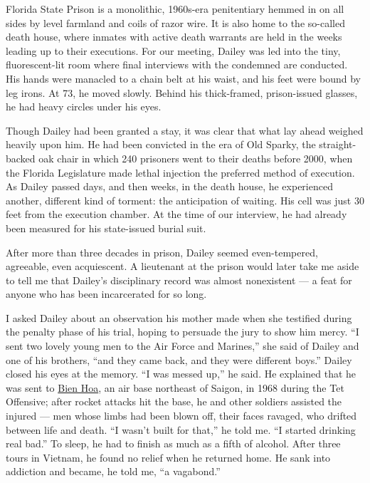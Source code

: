 Florida State Prison is a monolithic, 1960s-era penitentiary hemmed in
on all sides by level farmland and coils of razor wire. It is also home
to the so-called death house, where inmates with active death warrants
are held in the weeks leading up to their executions. For our meeting,
Dailey was led into the tiny, fluorescent-lit room where final
interviews with the condemned are conducted. His hands were manacled to
a chain belt at his waist, and his feet were bound by leg irons. At 73,
he moved slowly. Behind his thick-framed, prison-issued glasses, he had
heavy circles under his eyes.

Though Dailey had been granted a stay, it was clear that what lay ahead
weighed heavily upon him. He had been convicted in the era of Old
Sparky, the straight-backed oak chair in which 240 prisoners went to
their deaths before 2000, when the Florida Legislature made lethal
injection the preferred method of execution. As Dailey passed days, and
then weeks, in the death house, he experienced another, different kind
of torment: the anticipation of waiting. His cell was just 30 feet from
the execution chamber. At the time of our interview, he had already been
measured for his state-issued burial suit.

After more than three decades in prison, Dailey seemed even-tempered,
agreeable, even acquiescent. A lieutenant at the prison would later take
me aside to tell me that Dailey's disciplinary record was almost
nonexistent --- a feat for anyone who has been incarcerated for so long.

I asked Dailey about an observation his mother made when she testified
during the penalty phase of his trial, hoping to persuade the jury to
show him mercy. ``I sent two lovely young men to the Air Force and
Marines,'' she said of Dailey and one of his brothers, ``and they came
back, and they were different boys.'' Dailey closed his eyes at the
memory. ``I was messed up,'' he said. He explained that he was sent to
\href{https://www.historynet.com/big-ears-three-and-the-battle-of-bien-hoa.htm}{Bien
Hoa}, an air base northeast of Saigon, in 1968 during the Tet Offensive;
after rocket attacks hit the base, he and other soldiers assisted the
injured --- men whose limbs had been blown off, their faces ravaged, who
drifted between life and death. ``I wasn't built for that,'' he told me.
``I started drinking real bad.'' To sleep, he had to finish as much as a
fifth of alcohol. After three tours in Vietnam, he found no relief when
he returned home. He sank into addiction and became, he told me, ``a
vagabond.''

